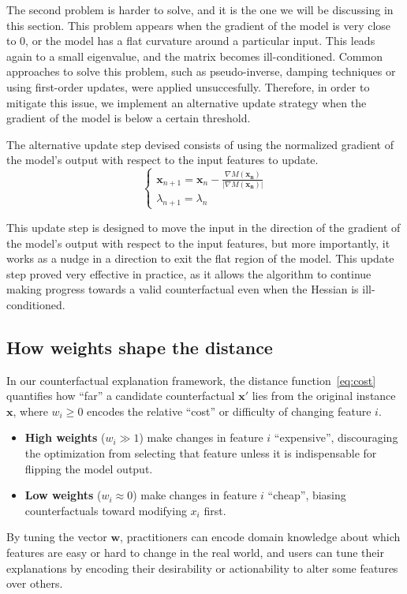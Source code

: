\documentclass[12pt]{extarticle}
\numberwithin{equation}{section}
\begin{document}
The second problem is harder to solve, and it is the one we will be discussing in this section. This problem appears when the gradient of the model is very close to 0, or the model has a flat curvature around a particular input. This leads again to a small eigenvalue, and the matrix becomes ill-conditioned. Common approaches to solve this problem, such as pseudo-inverse, damping techniques or using first-order updates, were applied unsuccesfully. Therefore, in order to mitigate this issue, we implement an alternative update strategy when the gradient of the model is below a certain threshold. %

The alternative update step devised consists of using the normalized gradient of the model's output with respect to the input features to update. 
\begin{equation}
    \begin{cases}
    \mathbf{x}_{n+1} = \mathbf{x}_n - \frac{\nabla M(\mathbf{x_n})}{|\nabla M(\mathbf{x_n})|}
    \\
    \lambda_{n+1} = \lambda_n
    \end{cases}
\end{equation}

This update step is designed to move the input in the direction of the gradient of the model's output with respect to the input features, but more importantly, it works as a nudge in a direction to exit the flat region of the model. This update step proved very effective in practice, as it allows the algorithm to continue making progress towards a valid counterfactual even when the Hessian is ill-conditioned. 

\subsection{How weights shape the distance}\label{sec:weights}
In our counterfactual explanation framework, the distance function~\eqref{eq:cost} quantifies how “far” a candidate counterfactual \(\mathbf{x}'\) lies from the original instance \(\mathbf{x}\), where \(w_i \ge 0\) encodes the relative “cost” or difficulty of changing feature \(i\).

\begin{itemize}
  \item \textbf{High weights} (\(w_i \!\!\gg\! 1\)) make changes in feature \(i\) “expensive”, discouraging the optimization from selecting that feature unless it is indispensable for flipping the model output.
  \item \textbf{Low weights} (\(w_i \!\!\approx\! 0\)) make changes in feature \(i\) “cheap”, biasing counterfactuals toward modifying \(x_i\) first.
\end{itemize}
By tuning the vector \(\mathbf{w}\), practitioners can encode domain knowledge about which features are easy or hard to change in the real world, and users can tune their explanations by encoding their desirability or actionability to alter some features over others.
\end{document}
